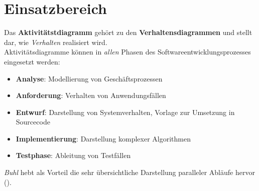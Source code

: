 \section{Einsatzbereich}

Das \textbf{Aktivitätstdiagramm} gehört zu den \textbf{Verhaltensdiagrammen} und stellt dar, wie \textit{Verhalten} realisiert wird.\\

\noindent
Aktivitätsdiagramme können in \textit{allen} Phasen des Softwareentwicklungsprozesses eingesetzt werden:

\begin{itemize}
    \item \textbf{Analyse}: Modellierung von Geschäftsprozessen
    \item \textbf{Anforderung}: Verhalten von Anwendungsfällen
    \item \textbf{Entwurf}: Darstellung von Systemverhalten, Vorlage zur Umsetzung in Sourcecode
    \item \textbf{Implementierung}: Darstellung komplexer Algorithmen
    \item \textbf{Testphase}: Ableitung von Testfällen
\end{itemize}

\noindent
\textit{Buhl} hebt als Vorteil die sehr übersichtliche Darstellung paralleler Abläufe hervor (\cite[57]{Buh09}).